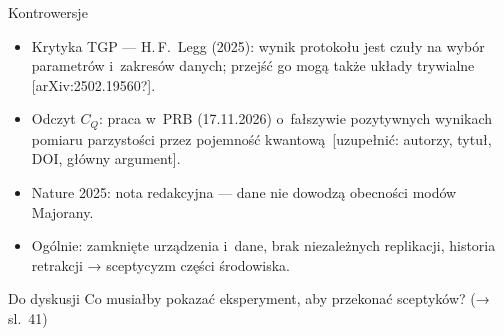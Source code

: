 \documentclass[aspectratio=169,10pt]{beamer}
\newcommand{\sprawdz}[1][sprawdzić]{\textcolor{mRed}{\scriptsize\,[#1]}}
\begin{document}
\begin{frame}{Kontrowersje}
  \begin{itemize}
    \item \alert{Krytyka TGP} — H.\,F.~Legg (2025): wynik protokołu jest czuły na wybór
          parametrów i~zakresów danych; przejść go mogą także układy trywialne
          \sprawdz[arXiv:2502.19560?].
    \item \alert{Odczyt $C_Q$}: praca w~PRB (17.11.2026) o~fałszywie pozytywnych wynikach
          pomiaru parzystości przez pojemność kwantową
          \sprawdz[uzupełnić: autorzy, tytuł, DOI, główny argument].
    \item Nature 2025: nota redakcyjna — dane nie dowodzą obecności modów Majorany.
    \item Ogólnie: zamknięte urządzenia i~dane, brak niezależnych replikacji, historia
          retrakcji → sceptycyzm części środowiska.
  \end{itemize}
  \vspace{2mm}
  \begin{block}{Do dyskusji}
    Co musiałby pokazać eksperyment, aby przekonać sceptyków? (→ sl.~41)
  \end{block}
\end{frame}
\end{document}
